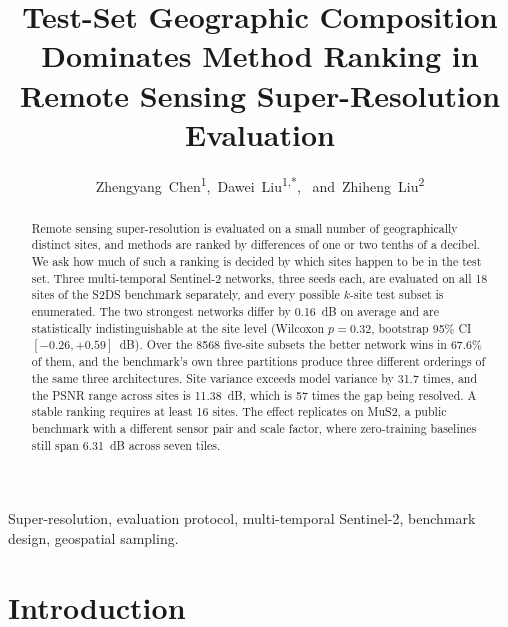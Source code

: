 \documentclass[journal]{IEEEtran}
\begin{document}
\title{Test-Set Geographic Composition Dominates Method Ranking in
Remote Sensing Super-Resolution Evaluation}

\author{Zhengyang~Chen\textsuperscript{1},~Dawei~Liu\textsuperscript{1,*},%
~and~Zhiheng~Liu\textsuperscript{2}}

\maketitle

\begin{abstract}
Remote sensing super-resolution is evaluated on a small number of geographically
distinct sites, and methods are ranked by differences of one or two tenths of a
decibel. We ask how much of such a ranking is decided by which sites happen to be
in the test set. Three multi-temporal Sentinel-2 networks, three seeds each, are
evaluated on all 18 sites of the S2DS benchmark separately, and every possible
$k$-site test subset is enumerated. The two strongest networks differ by 0.16~dB
on average and are statistically indistinguishable at the site level (Wilcoxon
$p = 0.32$, bootstrap 95\% CI $[-0.26, +0.59]$~dB). Over the 8568 five-site
subsets the better network wins in 67.6\% of them, and the benchmark's own three
partitions produce three different orderings of the same three architectures.
Site variance exceeds model variance by 31.7 times, and the PSNR range across
sites is 11.38~dB, which is 57 times the gap being resolved. A stable ranking
requires at least 16 sites. The effect replicates on MuS2, a public benchmark
with a different sensor pair and scale factor, where zero-training baselines
still span 6.31~dB across seven tiles.
\end{abstract}

\begin{IEEEkeywords}
Super-resolution, evaluation protocol, multi-temporal Sentinel-2, benchmark
design, geospatial sampling.
\end{IEEEkeywords}

\section{Introduction}
\end{document}
